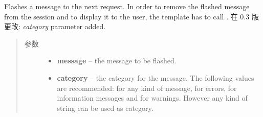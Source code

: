 \documentclass[a4paper,12pt]{sphinxmanual}
\begin{document}
\begin{fulllineitems}
\label{api:flask.flash}
Flashes a message to the next request.  In order to remove the
flashed message from the session and to display it to the user,
the template has to call {\hyperref[api:flask.get_flashed_messages]{}}.
在 0.3 版更改: \emph{category} parameter added.\begin{quote}\begin{description}
\item[{参数}] \leavevmode\begin{itemize}
\item {} 
\textbf{message} -- the message to be flashed.

\item {} 
\textbf{category} -- the category for the message.  The following values
are recommended:  for any kind of message,
 for errors,  for information
messages and  for warnings.  However any
kind of string can be used as category.

\end{itemize}

\end{description}\end{quote}

\end{fulllineitems}

\end{document}
